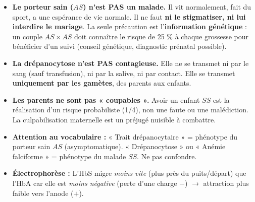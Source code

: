\documentclass[11pt]{article}
\begin{document}
\begin{attention}
\begin{itemize}
\item \textbf{Le porteur sain ($AS$) n'est PAS un malade.} Il vit normalement, fait du sport, a une espérance de vie normale. Il ne faut \textbf{ni le stigmatiser, ni lui interdire le mariage}. La seule précaution est l'\textbf{information génétique} : un couple $AS \times AS$ doit connaître le risque de 25 \% à chaque grossesse pour bénéficier d'un suivi (conseil génétique, diagnostic prénatal possible).
\item \textbf{La drépanocytose n'est PAS contagieuse.} Elle ne se transmet ni par le sang (sauf transfusion), ni par la salive, ni par contact. Elle se transmet \textbf{uniquement par les gamètes}, des parents aux enfants.
\item \textbf{Les parents ne sont pas « coupables ».} Avoir un enfant $SS$ est la réalisation d'un risque probabiliste (1/4), non une faute ou une malédiction. La culpabilisation maternelle est un préjugé nuisible à combattre.
\item \textbf{Attention au vocabulaire :} « Trait drépanocytaire » = phénotype du porteur sain $AS$ (asymptomatique). « Drépanocytose » ou « Anémie falciforme » = phénotype du malade $SS$. Ne pas confondre.
\item \textbf{Électrophorèse :} L'HbS migre \emph{moins vite} (plus près du puits/départ) que l'HbA car elle est \emph{moins négative} (perte d'une charge $-$) $\rightarrow$ attraction plus faible vers l'anode ($+$).
\end{itemize}
\end{attention}
\end{document}

